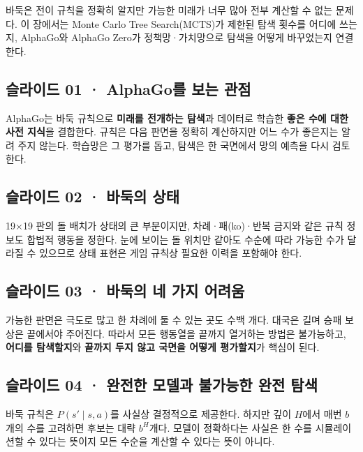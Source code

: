 \documentclass[11pt,a4paper]{article}
\begin{document}
바둑은 전이 규칙을 정확히 알지만 가능한 미래가 너무 많아 전부 계산할 수 없는 문제다. 이 장에서는 Monte Carlo Tree Search(MCTS)가 제한된 탐색 횟수를 어디에 쓰는지, AlphaGo와 AlphaGo Zero가 정책망·가치망으로 탐색을 어떻게 바꾸었는지 연결한다.\par

\subsection{슬라이드 01 · AlphaGo를 보는 관점}

AlphaGo는 바둑 규칙으로 \textbf{미래를 전개하는 탐색}과 데이터로 학습한 \textbf{좋은 수에 대한 사전 지식}을 결합한다. 규칙은 다음 판면을 정확히 계산하지만 어느 수가 좋은지는 알려 주지 않는다. 학습망은 그 평가를 돕고, 탐색은 한 국면에서 망의 예측을 다시 검토한다.\par

\subsection{슬라이드 02 · 바둑의 상태}

19×19 판의 돌 배치가 상태의 큰 부분이지만, 차례·패(ko)·반복 금지와 같은 규칙 정보도 합법적 행동을 정한다. 눈에 보이는 돌 위치만 같아도 수순에 따라 가능한 수가 달라질 수 있으므로 상태 표현은 게임 규칙상 필요한 이력을 포함해야 한다.\par

\subsection{슬라이드 03 · 바둑의 네 가지 어려움}

가능한 판면은 극도로 많고 한 차례에 둘 수 있는 곳도 수백 개다. 대국은 길며 승패 보상은 끝에서야 주어진다. 따라서 모든 행동열을 끝까지 열거하는 방법은 불가능하고, \textbf{어디를 탐색할지}와 \textbf{끝까지 두지 않고 국면을 어떻게 평가할지}가 핵심이 된다.\par

\subsection{슬라이드 04 · 완전한 모델과 불가능한 완전 탐색}

바둑 규칙은 $P(s'\mid s,a)$를 사실상 결정적으로 제공한다. 하지만 깊이 $H$에서 매번 $b$개의 수를 고려하면 후보는 대략 $b^H$개다. 모델이 정확하다는 사실은 한 수를 시뮬레이션할 수 있다는 뜻이지 모든 수순을 계산할 수 있다는 뜻이 아니다.\par
\end{document}

